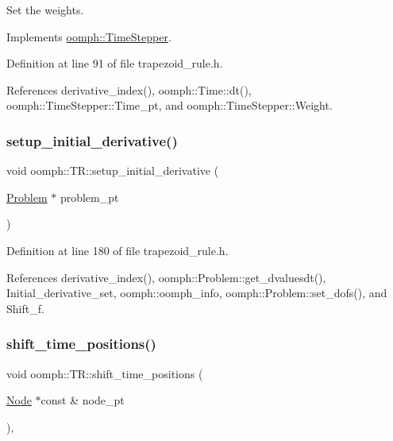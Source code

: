 Set the weights. 



Implements \hyperlink{classoomph_1_1TimeStepper_a028fa3a8d3c6db6b0ddf580cb0468d55}{oomph\+::\+Time\+Stepper}.



Definition at line 91 of file trapezoid\+\_\+rule.\+h.



References derivative\+\_\+index(), oomph\+::\+Time\+::dt(), oomph\+::\+Time\+Stepper\+::\+Time\+\_\+pt, and oomph\+::\+Time\+Stepper\+::\+Weight.

\mbox{\label{classoomph_1_1TR_abde5c3804dd51162f11c50dacb65b315}} 
\subsubsection{\texorpdfstring{setup\+\_\+initial\+\_\+derivative()}{setup\_initial\_derivative()}}
{\footnotesize\ttfamily void oomph\+::\+T\+R\+::setup\+\_\+initial\+\_\+derivative (\begin{DoxyParamCaption}\item[{\hyperlink{classoomph_1_1Problem}{Problem} $\ast$}]{problem\+\_\+pt }\end{DoxyParamCaption})\hspace{0.3cm}{\ttfamily [inline]}}



Definition at line 180 of file trapezoid\+\_\+rule.\+h.



References derivative\+\_\+index(), oomph\+::\+Problem\+::get\+\_\+dvaluesdt(), Initial\+\_\+derivative\+\_\+set, oomph\+::oomph\+\_\+info, oomph\+::\+Problem\+::set\+\_\+dofs(), and Shift\+\_\+f.

\mbox{\label{classoomph_1_1TR_a15ab8859ae1a87f14687dcec94f68e03}} 
\subsubsection{\texorpdfstring{shift\+\_\+time\+\_\+positions()}{shift\_time\_positions()}}
{\footnotesize\ttfamily void oomph\+::\+T\+R\+::shift\+\_\+time\+\_\+positions (\begin{DoxyParamCaption}\item[{\hyperlink{classoomph_1_1Node}{Node} $\ast$const \&}]{node\+\_\+pt }\end{DoxyParamCaption})\hspace{0.3cm}{\ttfamily [inline]}, {\ttfamily [virtual]}}



